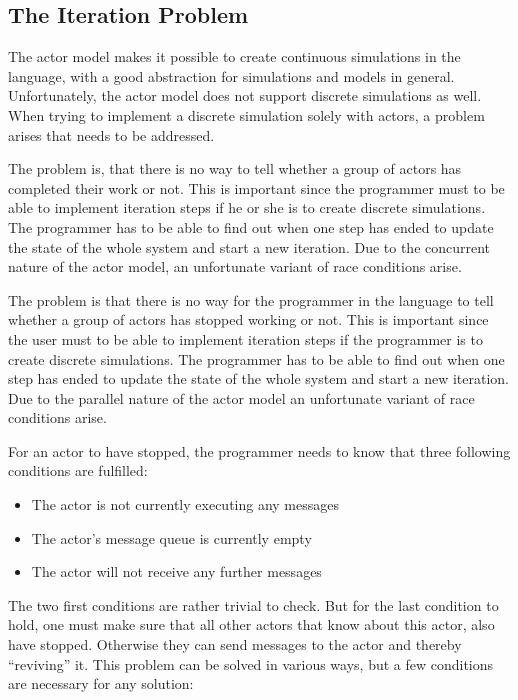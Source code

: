 \subsection{The Iteration Problem}\label{iterprob}

The actor model makes it possible to create continuous simulations in the language, with a good abstraction for simulations and models in general. Unfortunately, the actor model does not support discrete simulations as well. When trying to implement a discrete simulation solely with actors, a problem arises that needs to be addressed.

The problem is, that there is no way to tell whether a group of actors has completed their work or not. This is important since the programmer must to be able to implement iteration steps if he or she is to create discrete simulations. The programmer has to be able to find out when one step has ended to update the state of the whole system and start a new iteration. Due to the concurrent nature of the actor model, an unfortunate variant of race conditions arise.

The problem is that there is no way for the programmer in the language to tell whether a group of actors has stopped working or not. This is important since the user must to be able to implement iteration steps if the programmer is to create discrete simulations. The programmer has to be able to find out when one step has ended to update the state of the whole system and start a new iteration. Due to the parallel nature of the actor model an unfortunate variant of race conditions arise.

For an actor to have stopped, the programmer needs to know that three following conditions are fulfilled:
\begin{itemize}
\item The actor is not currently executing any messages
\item The actor's message queue is currently empty
\item The actor will not receive any further messages
\end{itemize} 

The two first conditions are rather trivial to check. But for the last condition to hold, one must make sure that all other actors that know about this actor, also have stopped. Otherwise they can send messages to the actor and thereby \enquote{reviving} it. This problem can be solved in various ways, but a few conditions are necessary for any solution:

